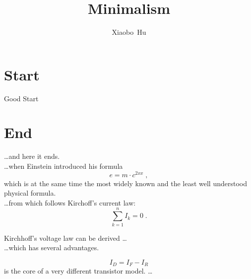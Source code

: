 \documentclass[a4paper,11pt]{article}
\author{Xiaobo~Hu}
\title{Minimalism}
\begin{document}
\maketitle
\tableofcontents
\section{Start}
Good Start
\section{End}
\ldots and here it ends.\\
\ldots when Einstein introduced his formula
\begin{equation}
  e = m \cdot c^{2xx} \; ,
\end{equation}
which is at the same time the most widely known
and the least well understood physical formula.\\
\ldots from which follows Kirchoff’s current law:
\begin{equation}
\sum_{k=1}^{n} I_k = 0 \; .
\end{equation}

Kirchhoff’s voltage law can be derived \ldots\\
\ldots which has several advantages.

\begin{equation}
I_{D} = I_F - I_R
\end{equation}
is the core of a very different transistor model. \ldots
\end{document}

